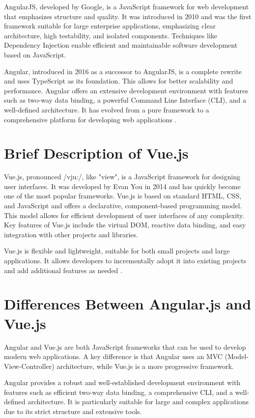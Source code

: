 AngularJS, developed by Google, is a JavaScript framework for web development that emphasizes structure and quality. It was introduced in 2010 and was the first framework suitable for large enterprise applications, emphasizing clear architecture, high testability, and isolated components. Techniques like Dependency Injection enable efficient and maintainable software development based on JavaScript.

Angular, introduced in 2016 as a successor to AngularJS, is a complete rewrite and uses TypeScript as its foundation. This allows for better scalability and performance. Angular offers an extensive development environment with features such as two-way data binding, a powerful Command Line Interface (CLI), and a well-defined architecture. It has evolved from a pure framework to a comprehensive platform for developing web applications \cite{angular}.

\section{Brief Description of Vue.js}

Vue.js, pronounced /vju:/, like "view", is a JavaScript framework for designing user interfaces. It was developed by Evan You in 2014 and has quickly become one of the most popular frameworks. Vue.js is based on standard HTML, CSS, and JavaScript and offers a declarative, component-based programming model. This model allows for efficient development of user interfaces of any complexity. Key features of Vue.js include the virtual DOM, reactive data binding, and easy integration with other projects and libraries.

Vue.js is flexible and lightweight, suitable for both small projects and large applications. It allows developers to incrementally adopt it into existing projects and add additional features as needed \cite{vuejs}.

\section{Differences Between Angular.js and Vue.js}

Angular and Vue.js are both JavaScript frameworks that can be used to develop modern web applications. A key difference is that Angular uses an MVC (Model-View-Controller) architecture, while Vue.js is a more progressive framework.

Angular provides a robust and well-established development environment with features such as efficient two-way data binding, a comprehensive CLI, and a well-defined architecture. It is particularly suitable for large and complex applications due to its strict structure and extensive tools.

